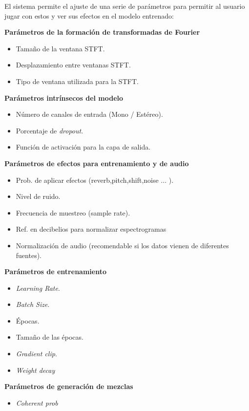El sistema permite el ajuste de una serie de parámetros para permitir al usuario jugar con estos y ver sus efectos en el modelo entrenado:

\textbf{Parámetros de la formación de transformadas de Fourier}
\begin{itemize}
    \item Tamaño de la ventana STFT.
    \item Desplazamiento entre ventanas STFT.
    \item Tipo de ventana utilizada para la STFT.
\end{itemize}

\textbf{Parámetros intrínsecos del modelo}
\begin{itemize}
    \item Número de canales de entrada (Mono / Estéreo).
    \item Porcentaje de \textit{dropout}.
    \item Función de activación para la capa de salida.
\end{itemize}

\textbf{Parámetros de efectos para entrenamiento y de audio}
\begin{itemize}
    \item Prob. de aplicar efectos (reverb,pitch,shift,noise ... ).
    \item Nivel de ruido.
    \item Frecuencia de muestreo (sample rate).
    \item Ref. en decibelios para normalizar espectrogramas
    \item Normalización de audio (recomendable si los datos vienen de diferentes fuentes).
\end{itemize}

\textbf{Parámetros de entrenamiento}
\begin{itemize}
    \item \textit{Learning Rate}.
    \item \textit{Batch Size}.
    \item Épocas.
    \item Tamaño de las épocas.
    \item \textit{Gradient clip}.
    \item \textit{Weight decay}
\end{itemize}

\textbf{Parámetros de generación de mezclas}
\begin{itemize}
    \item \textit{Coherent prob}
\end{itemize}

